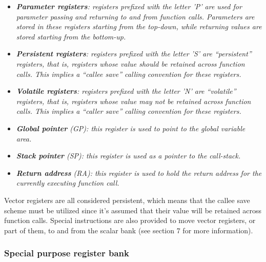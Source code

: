             \begin{itemize}

                \item \textit{\textbf{Parameter registers}: registers prefixed with the letter 'P' are used for parameter passing and returning to and from function calls. Parameters are stored in these registers starting from the top-down, while returning values are stored starting from the bottom-up.}

                \item \textit{\textbf{Persistent registers}: registers prefixed with the letter 'S' are ``persistent'' registers, that is, registers whose value should be retained across function calls. This implies a ``callee save'' calling convention for these registers.}

                \item \textit{\textbf{Volatile registers}: registers prefixed with the letter 'N' are ``volatile'' registers, that is, registers whose value may not be retained across function calls. This implies a ``caller save'' calling convention for these registers.}

                \item \textit{\textbf{Global pointer} (GP): this register is used to point to the global variable area.}
                \item \textit{\textbf{Stack pointer} (SP): this register is used as a pointer to the call-stack.}
                \item \textit{\textbf{Return address} (RA): this register is used to hold the return address for the currently executing function call.}

            \end{itemize}

            Vector registers are all considered persistent, which means that the callee save scheme must be utilized since it's assumed that their value will be retained across function calls. Special instructions are also provided to move vector registers, or part of them, to and from the scalar bank (see section 7 for more information).

        \subsubsection{Special purpose register bank}

            \vspace{10pt}

